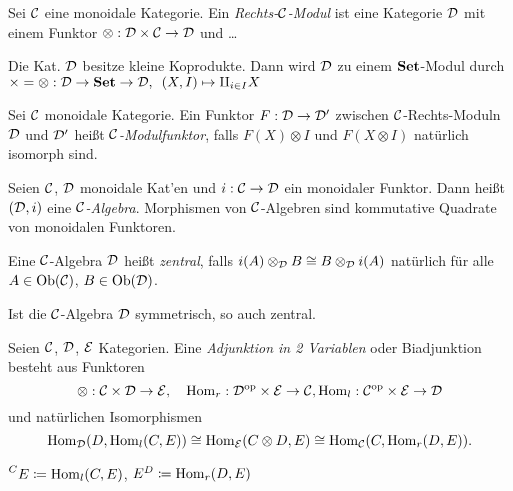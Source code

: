 \documentclass{cheat-sheet}
\begin{document}
\begin{defn}
  Sei $\mathcal{C}$ eine monoidale Kategorie. Ein \emph{Rechts-$\mathcal{C}$-Modul} ist eine Kategorie $\mathcal{D}$ mit einem Funktor $\otimes : \mathcal{D} \times \mathcal{C} \to \mathcal{D}$ und \ldots
\end{defn}

\begin{bsp}
  Die Kat. $\mathcal{D}$ besitze kleine Koprodukte.
  Dann wird $\mathcal{D}$ zu einem $\mathbf{Set}$-Modul durch $\times = \otimes : \mathcal{D} \to \mathbf{Set} \to \mathcal{D}, \enspace (X, I) \mapsto \amalg_{i \in I} X$
\end{bsp}

\begin{defn}
  Sei $\mathcal{C}$ monoidale Kategorie. Ein Funktor $F : \mathcal{D} \to \mathcal{D}'$ zwischen $\mathcal{C}$-Rechts-Moduln $\mathcal{D}$ und $\mathcal{D}'$ heißt \emph{$\mathcal{C}$-Modulfunktor}, falls $F(X) \otimes I$ und $F(X \otimes I)$ natürlich isomorph sind.
\end{defn}

\begin{defn}
  Seien $\mathcal{C}$, $\mathcal{D}$ monoidale Kat'en und $i : \mathcal{C} \to \mathcal{D}$ ein monoidaler Funktor.
  Dann heißt $(\mathcal{D}, i)$ eine \emph{$\mathcal{C}$-Algebra}.
  Morphismen von $\mathcal{C}$-Algebren sind kommutative Quadrate von monoidalen Funktoren.
\end{defn}


\begin{defn}
  Eine $\mathcal{C}$-Algebra $\mathcal{D}$ heißt \emph{zentral}, falls $i(A) \otimes_{\mathcal{D}} B \cong B \otimes_{\mathcal{D}} i(A)$ natürlich für alle $A \in \operatorname{Ob}(\mathcal{C})$, $B \in \operatorname{Ob}(\mathcal{D})$.
\end{defn}

\begin{bem}
  Ist die $\mathcal{C}$-Algebra $\mathcal{D}$ symmetrisch, so auch zentral.
\end{bem}

\begin{defn}
  Seien $\mathcal{C}$, $\mathcal{D}$, $\mathcal{E}$ Kategorien. Eine \emph{Adjunktion in 2 Variablen} oder Biadjunktion besteht aus Funktoren
  \[
    \otimes : \mathcal{C} \times \mathcal{D} \to \mathcal{E}, \quad
    \operatorname{Hom}_r : \mathcal{D}^{\mathrm{op}} \times \mathcal{E} \to \mathcal{C},
    \operatorname{Hom}_l : \mathcal{C}^{\mathrm{op}} \times \mathcal{E} \to \mathcal{D}
  \]
  und natürlichen Isomorphismen
  \[
    \operatorname{Hom}_{\mathcal{D}}(D, \operatorname{Hom}_l(C, E)) \cong \operatorname{Hom}_{\mathcal{E}}(C \otimes D, E) \cong \operatorname{Hom}_{\mathcal{C}}(C, \operatorname{Hom}_r(D, E)).
  \]
\end{defn}

\begin{nota}
  $\prescript{C}{} E \coloneqq \operatorname{Hom}_l(C, E)$,
  $E^D \coloneqq \operatorname{Hom}_r(D, E)$
\end{nota}
\end{document}
